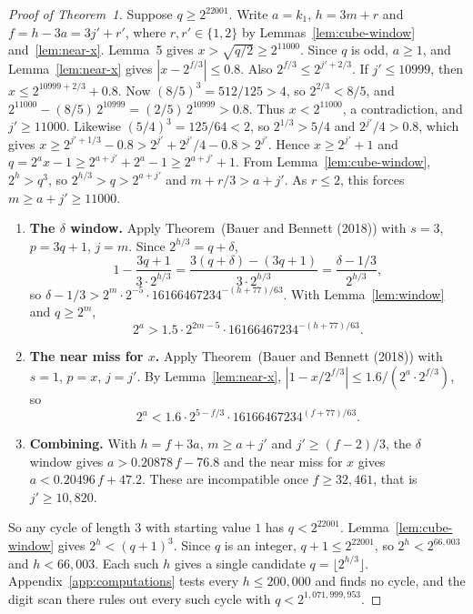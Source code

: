 \documentclass[11pt]{article}
\begin{document}
\begin{proof}[Proof of Theorem~1]
Suppose $q \ge 2^{22001}$.
Write $a = k_1$, $h = 3m + r$ and $f = h - 3a = 3j' + r'$, where $r, r' \in \{1, 2\}$ by Lemmas~\ref{lem:cube-window} and~\ref{lem:near-x}.
Lemma~5 gives $x > \sqrt{q/2} \ge 2^{11000}$.
Since $q$ is odd, $a \ge 1$, and Lemma~\ref{lem:near-x} gives $|x - 2^{f/3}| \le 0.8$.
Also $2^{f/3} \le 2^{j'+2/3}$.
If $j' \le 10999$, then $x \le 2^{10999+2/3} + 0.8$.
Now $(8/5)^3 = 512/125 > 4$, so $2^{2/3} < 8/5$, and $2^{11000} - (8/5)\,2^{10999} = (2/5)\,2^{10999} > 0.8$.
Thus $x < 2^{11000}$, a contradiction, and $j' \ge 11000$.
Likewise $(5/4)^3 = 125/64 < 2$, so $2^{1/3} > 5/4$ and $2^{j'}/4 > 0.8$, which gives $x \ge 2^{j'+1/3} - 0.8 > 2^{j'} + 2^{j'}/4 - 0.8 > 2^{j'}$.
Hence $x \ge 2^{j'}+1$ and $q = 2^a x - 1 \ge 2^{a+j'} + 2^a - 1 \ge 2^{a+j'} + 1$.
From Lemma~\ref{lem:cube-window}, $2^h > q^3$, so $2^{h/3} > q > 2^{a+j'}$ and $m + r/3 > a + j'$.
As $r \le 2$, this forces $m \ge a + j' \ge 11000$.
\begin{enumerate}
\item \textbf{The $\delta$ window.}
Apply Theorem~(Bauer and Bennett (2018)) with $s = 3$, $p = 3q + 1$, $j = m$.
Since $2^{h/3} = q + \delta$,
\[
1 - \frac{3q+1}{3 \cdot 2^{h/3}} = \frac{3(q+\delta) - (3q+1)}{3 \cdot 2^{h/3}} = \frac{\delta - 1/3}{2^{h/3}},
\]
so $\delta - 1/3 > 2^m \cdot 2^{-5} \cdot 16166467234^{-(h+77)/63}$.
With Lemma~\ref{lem:window} and $q \ge 2^m$,
\[
2^a > 1.5 \cdot 2^{2m-5} \cdot 16166467234^{-(h+77)/63}.
\]
\item \textbf{The near miss for $x$.}
Apply Theorem~(Bauer and Bennett (2018)) with $s = 1$, $p = x$, $j = j'$.
By Lemma~\ref{lem:near-x}, $|1 - x/2^{f/3}| \le 1.6/(2^a \cdot 2^{f/3})$, so
\[
2^a < 1.6 \cdot 2^{5 - f/3} \cdot 16166467234^{(f+77)/63}.
\]
\item \textbf{Combining.}
With $h = f + 3a$, $m \ge a + j'$ and $j' \ge (f-2)/3$, the $\delta$ window gives $a > 0.20878\, f - 76.8$ and the near miss for $x$ gives $a < 0.20496\, f + 47.2$.
These are incompatible once $f \ge 32{,}461$, that is $j' \ge 10{,}820$.
\end{enumerate}
So any cycle of length $3$ with starting value $1$ has $q < 2^{22001}$.
Lemma~\ref{lem:cube-window} gives $2^h < (q+1)^3$.
Since $q$ is an integer, $q + 1 \le 2^{22001}$, so $2^h < 2^{66{,}003}$ and $h < 66{,}003$.
Each such $h$ gives a single candidate $q = \lfloor 2^{h/3} \rfloor$.
Appendix~\ref{app:computations} tests every $h \le 200{,}000$ and finds no cycle, and the digit scan there rules out every such cycle with $q < 2^{1{,}071{,}999{,}953}$.
\end{proof}
\end{document}
